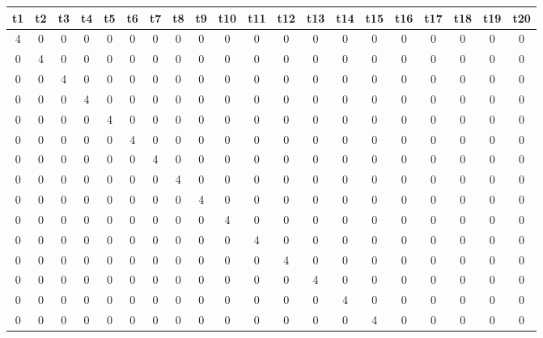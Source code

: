 \documentclass{IEEEtran}
\begin{document}
\begin{table}[h!] 
\centering
\begin{tabular}{|c|c|c|c|c|c|c|c|c|c|c|c|c|c|c|c|c|c|c|c|}
\hline
\textbf{t1} & \textbf{t2} & \textbf{t3} & \textbf{t4} & \textbf{t5} & \textbf{t6} & \textbf{t7} & \textbf{t8} & \textbf{t9} & \textbf{t10} & \textbf{t11} & \textbf{t12} &
\textbf{t13} & \textbf{t14} & \textbf{t15} & \textbf{t16} & \textbf{t17} & \textbf{t18} &\textbf{t19} & \textbf{t20} \\
\hline
\cellcolor{purple!30}4 & 0 & 0 & 0 & 0 & 0 & 0 & 0 & 0 & 0 & 0 & 0 & 0 & 0 & 0 & 0 & 0 & 0 & 0 & 0\\
\hline
0 & \cellcolor{purple!30}4 & 0 & 0 & 0 & 0 & 0 & 0 & 0 & 0 & 0 & 0 & 0 & 0 & 0 & 0 & 0 & 0 & 0 & 0\\
\hline
0 & 0 & \cellcolor{purple!30}4 & 0 & 0 & 0 & 0 & 0 & 0 & 0 & 0 & 0 & 0 & 0 & 0 & 0 & 0 & 0 & 0 & 0\\
\hline
0 & 0 & 0 & \cellcolor{purple!30}4 & 0 & 0 & 0 & 0 & 0 & 0 & 0 & 0 & 0 & 0 & 0 & 0 & 0 & 0 & 0 & 0\\
\hline
0 & 0 & 0 & 0 & \cellcolor{purple!30}4 & 0 & 0 & 0 & 0 & 0 & 0 & 0 & 0 & 0 & 0 & 0 & 0 & 0 & 0 & 0\\
\hline
0 & 0 & 0 & 0 & 0 & \cellcolor{purple!30}4 & 0 & 0 & 0 & 0 & 0 & 0 & 0 & 0 & 0 & 0 & 0 & 0 & 0 & 0\\
\hline
0 & 0 & 0 & 0 & 0 & 0 & \cellcolor{purple!30}4 & 0 & 0 & 0 & 0 & 0 & 0 & 0 & 0 & 0 & 0 & 0 & 0 & 0\\
\hline
0 & 0 & 0 & 0 & 0 & 0 & 0 & \cellcolor{purple!30}4 & 0 & 0 & 0 & 0 & 0 & 0 & 0 & 0 & 0 & 0 & 0 & 0\\
\hline
0 & 0 & 0 & 0 & 0 & 0 & 0 & 0 & \cellcolor{purple!30}4 & 0 & 0 & 0 & 0 & 0 & 0 & 0 & 0 & 0 & 0 & 0\\
\hline
0 & 0 & 0 & 0 & 0 & 0 & 0 & 0 & 0 & \cellcolor{purple!30}4 & 0 & 0 & 0 & 0 & 0 & 0 & 0 & 0 & 0 & 0\\
\hline
0 & 0 & 0 & 0 & 0 & 0 & 0 & 0 & 0 & 0 & \cellcolor{purple!30}4 & 0 & 0 & 0 & 0 & 0 & 0 & 0 & 0 & 0\\
\hline
0 & 0 & 0 & 0 & 0 & 0 & 0 & 0 & 0 & 0 & 0 & \cellcolor{purple!30}4 & 0 & 0 & 0 & 0 & 0 & 0 & 0 & 0\\
\hline
0 & 0 & 0 & 0 & 0 & 0 & 0 & 0 & 0 & 0 & 0 & 0 & \cellcolor{purple!30}4 & 0 & 0 & 0 & 0 & 0 & 0 & 0\\
\hline
0 & 0 & 0 & 0 & 0 & 0 & 0 & 0 & 0 & 0 & 0 & 0 & 0 & \cellcolor{purple!30}4 & 0 & 0 & 0 & 0 & 0 & 0\\
\hline
0 & 0 & 0 & 0 & 0 & 0 & 0 & 0 & 0 & 0 & 0 & 0 & 0 & 0 & \cellcolor{purple!30}4 & 0 & 0 & 0 & 0 & 0\\

\end{tabular}
\end{table}
\end{document}
